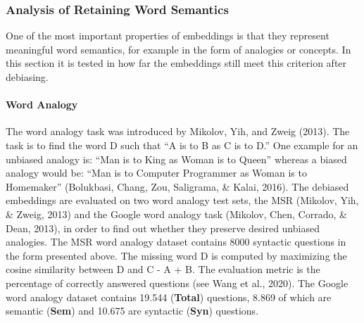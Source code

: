 \documentclass[
  english,
  man,floatsintext]{apa6}
\let\oldparagraph\paragraph
\renewcommand{\paragraph}[1]{\oldparagraph{#1}\mbox{}}
\begin{document}
\hypertarget{analysis-of-retaining-word-semantics}{%
\subsubsection{Analysis of Retaining Word Semantics}\label{analysis-of-retaining-word-semantics}}

One of the most important properties of embeddings is that they represent meaningful word semantics, for example in the form of analogies or concepts. In this section it is tested in how far the embeddings still meet this criterion after debiasing.

\hypertarget{word-analogy}{%
\paragraph{Word Analogy}\label{word-analogy}}

The word analogy task was introduced by Mikolov, Yih, and Zweig (2013). The task is to find the word D such that ``A is to B as C is to D.'' One example for an unbiased analogy is: ``Man is to King as Woman is to Queen'' whereas a biased analogy would be: ``Man is to Computer Programmer as Woman is to Homemaker'' (Bolukbasi, Chang, Zou, Saligrama, \& Kalai, 2016). The debiased embeddings are evaluated on two word analogy test sets, the MSR (Mikolov, Yih, \& Zweig, 2013) and the Google word analogy task (Mikolov, Chen, Corrado, \& Dean, 2013), in order to find out whether they preserve desired unbiased analogies.
The MSR word analogy dataset contains 8000 syntactic questions in the form presented above. The missing word D is computed by maximizing the cosine similarity between D and C - A + B. The evaluation metric is the percentage of correctly answered questions (see Wang et al., 2020).
The Google word analogy dataset contains 19.544 (\textbf{Total}) questions, 8.869 of which are semantic (\textbf{Sem}) and 10.675 are syntactic (\textbf{Syn}) questions.
\end{document}
